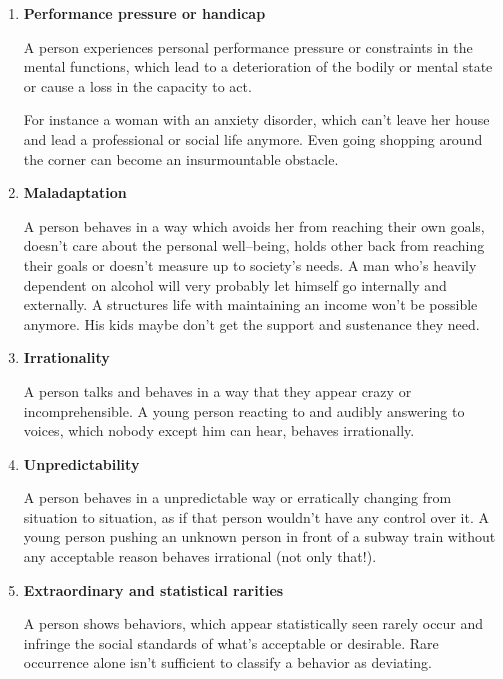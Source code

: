 \documentclass[../main.tex]{subfiles}
\begin{document}
\begin{enumerate}
\item \textbf{Performance pressure or handicap}

  A person experiences personal performance pressure or constraints in the mental functions,
  which lead to a deterioration of the bodily or mental state or cause a loss in the capacity to act.
  
  For instance a woman with an anxiety disorder, which can't leave her house and lead a professional or social life anymore.
  Even going shopping around the corner can become an insurmountable obstacle.

\item \textbf{Maladaptation}

  A person behaves in a way which avoids her from reaching their own goals, doesn't care about the personal well--being,
  holds other back from reaching their goals or  doesn't measure up to society's needs.
  A man who's heavily dependent on alcohol will very probably let himself go internally and externally.
  A structures life with maintaining an income won't be possible anymore.
  His kids maybe don't get the support and sustenance they need.

\item \textbf{Irrationality}

  A person talks and behaves in a way that they appear crazy or incomprehensible.
  A young person reacting to and audibly answering to voices, which nobody except him can hear, behaves irrationally.

\item \textbf{Unpredictability}

  A person behaves in a unpredictable way or erratically changing from situation to situation, as if that person wouldn't have any control over it.
  A young person pushing an unknown person in front of a subway train without any acceptable reason behaves irrational (not only that!).

\item \textbf{Extraordinary and statistical rarities}

  A person shows behaviors, which appear statistically seen rarely occur and infringe the social standards of what's acceptable or desirable.
  Rare occurrence alone isn't sufficient to classify a behavior as deviating.


\end{enumerate}
\end{document}
